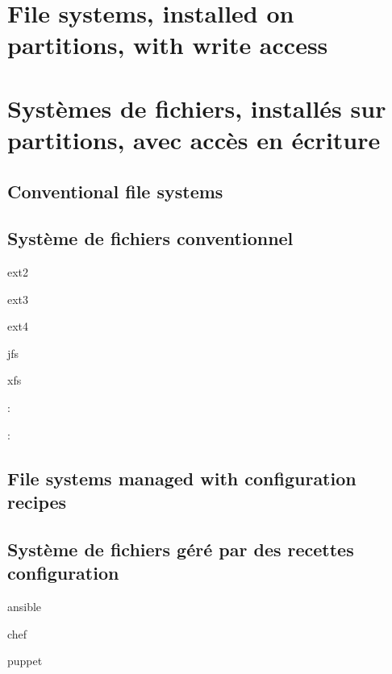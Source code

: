 \ml
{\section{File systems, installed on partitions, with write access}}
{\section{Systèmes de fichiers, installés sur partitions, avec accès en écriture}}

\ml
{\subsection{Conventional file systems}}
{\subsection{Système de fichiers conventionnel}}

\begin{itmz}
\item{ext2}
\item{ext3}
\item{ext4}
\item{jfs}
\item{xfs}
\end{itmz}

:
\begin{itmz}
\item{\ml{\todo}
{\todo}}
\end{itmz}

:
\begin{itmz}
\item{\ml{\todo}
{\todo}}
\end{itmz}

\ml
{\subsection{File systems managed with configuration recipes}}
{\subsection{Système de fichiers géré par des recettes configuration}}

\begin{itmz}
\item{ansible}
\item{chef}
\item{puppet}
\end{itmz}

